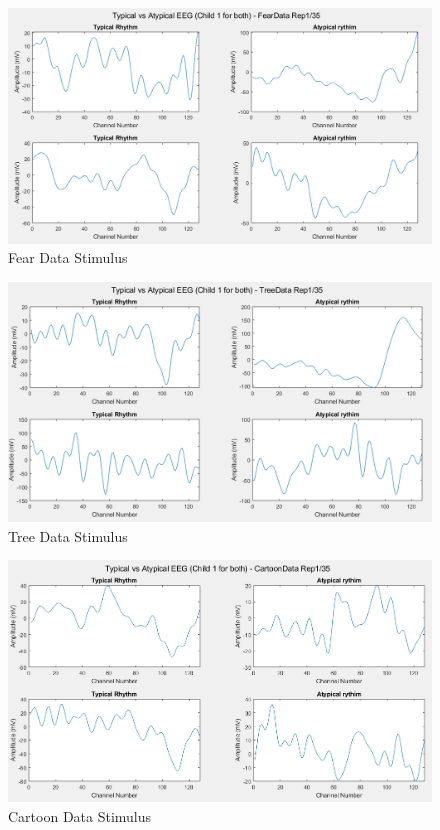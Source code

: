 \begin{appendices}
\begin{figure}[ht!]%
    \centering
    \includegraphics[width=14cm]{images/matplot8}%
    \caption{Fear Data Stimulus}%
\end{figure}

\begin{figure}[ht!]%
    \centering
    \includegraphics[width=14cm]{images/matplot9}%
    \caption{Tree Data Stimulus}%
\end{figure}

\begin{figure}[ht!]%
    \centering
    \includegraphics[width=14cm]{images/matplot10}%
    \caption{Cartoon Data Stimulus}%
\end{figure}


\end{appendices}
